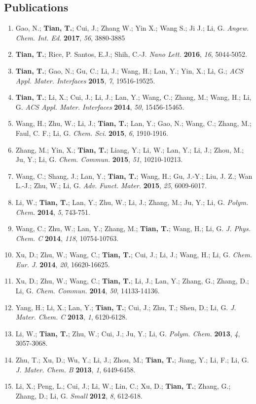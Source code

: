 \documentclass[margin]{res}
\begin{document}
\begin{resume}
\section{Publications}
\begin{enumerate}
\item Gao, N.; \textbf{Tian, T.}; Cui, J.; Zhang W.; Yin X.; Wang S.;
  Ji J.; Li, G. \textit{Angew. Chem. Int. Ed.} \textbf{2017},
  \textit{56}, 3880-3885
  \item \textbf{Tian, T.}; Rice, P. Santos, E.J.; Shih, C.-J. \textit{Nano Lett.} \textbf{2016}, \textit{16}, 5044-5052.
  \item \textbf{Tian, T.}; Gao, N.; Gu, C.; Li, J.; Wang, H.; Lan, Y.; Yin, X.; Li, G.; \textit{ACS Appl. Mater. Interfaces} \textbf{2015}, \textit{7}, 19516-19525.
  \item \textbf{Tian, T.}; Li, X.; Cui, J.; Li, J.; Lan, Y.; Wang, C.; Zhang, M.; Wang, H.; Li, G. \textit{ACS Appl. Mater. Interfaces} \textbf{2014}, \textit{50}, 15456-15465.
  \item Wang, H.; Zhu, W.; Li, J.; \textbf{Tian, T.}; Lan, Y.; Gao, N.; Wang, C.; Zhang, M.; Faul, C. F.; Li, G. \textit{Chem. Sci.} \textbf{2015}, \textit{6}, 1910-1916.
  \item Zhang, M.; Yin, X.; \textbf{Tian, T.}; Liang, Y.; Li, W.; Lan, Y.; Li, J.; Zhou, M.; Ju, Y.; Li, G. \textit{Chem. Commun.} \textbf{2015}, \textit{51}, 10210-10213.
  \item Wang, C.; Shang, J.; Lan, Y.; \textbf{Tian, T.}; Wang, H.; Gu, J.-Y.; Liu, J. Z.; Wan L.-J.; Zhu, W.; Li, G. \textit{Adv. Funct. Mater.} \textbf{2015}, \textit{25}, 6009-6017.
  \item Li, W.; \textbf{Tian, T.}; Lan, Y.; Zhu, W.; Li, J.; Zhang, M.; Ju, Y.; Li, G. \textit{Polym. Chem.} \textbf{2014}, \textit{5}, 743-751.
  \item Wang, C.; Zhu, W.; Lan, Y.; Zhang, M.; \textbf{Tian, T.}; Wang, H.; Li, G. \textit{J. Phys. Chem. C} \textbf{2014}, \textit{118}, 10754-10763.
  \item Xu, D.; Zhu, W.; Wang, C.; \textbf{Tian, T.}; Cui, J.; Li, J.; Wang, H.; Li, G. \textit{Chem. Eur. J.} \textbf{2014}, \textit{20}, 16620-16625.
  \item Xu, D.; Zhu, W.; Wang, C.; \textbf{Tian, T.}; Li, J.; Lan, Y.; Zhang, G.; Zhang, D.; Li, G. \textit{Chem. Commun.} \textbf{2014}, \textit{50}, 14133-14136.
  \item Yang, H.; Li, X.; Lan, Y.; \textbf{Tian, T.}; Cui, J.; Zhu, T.; Shen, D.; Li, G. \textit{J. Mater. Chem. C} \textbf{2013}, \textit{1}, 6120-6128.
  \item Li, W.; \textbf{Tian, T.}; Zhu, W.; Cui, J.; Ju, Y.; Li, G. \textit{Polym. Chem.} \textbf{2013}, \textit{4}, 3057-3068.
  \item Zhu, T.; Xu, D.; Wu, Y.; Li, J.; Zhou, M.; \textbf{Tian, T.}; Jiang, Y.; Li, F.; Li, G. \textit{J. Mater. Chem. B} \textbf{2013}, \textit{1}, 6449-6458.
  \item Li, X.; Peng, L.; Cui, J.; Li, W.; Lin, C.; Xu, D.; \textbf{Tian, T.}; Zhang, G.; Zhang, D.; Li, G. \textit{Small} \textbf{2012}, \textit{8}, 612-618.



\end{enumerate}
\end{resume}
\end{document}
